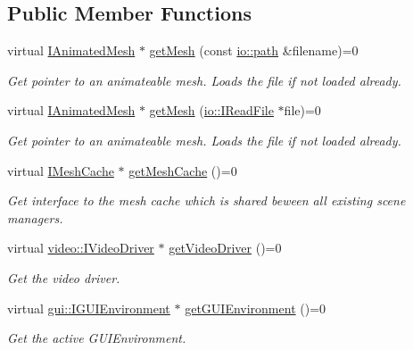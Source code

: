 \subsection*{Public Member Functions}
\begin{DoxyCompactItemize}
\item 
virtual \hyperlink{classirr_1_1scene_1_1IAnimatedMesh}{I\+Animated\+Mesh} $\ast$ \hyperlink{classirr_1_1scene_1_1ISceneManager_a63894c3f3d46cfc385116f1705935e03}{get\+Mesh} (const \hyperlink{namespaceirr_1_1io_ab1bdc45edb3f94d8319c02bc0f840ee1}{io\+::path} \&filename)=0
\begin{DoxyCompactList}\small\item\em Get pointer to an animateable mesh. Loads the file if not loaded already. \end{DoxyCompactList}\item 
virtual \hyperlink{classirr_1_1scene_1_1IAnimatedMesh}{I\+Animated\+Mesh} $\ast$ \hyperlink{classirr_1_1scene_1_1ISceneManager_af0ff82d7bac969d6a30f67c7b1fa0c46}{get\+Mesh} (\hyperlink{classirr_1_1io_1_1IReadFile}{io\+::\+I\+Read\+File} $\ast$file)=0
\begin{DoxyCompactList}\small\item\em Get pointer to an animateable mesh. Loads the file if not loaded already. \end{DoxyCompactList}\item 
virtual \hyperlink{classirr_1_1scene_1_1IMeshCache}{I\+Mesh\+Cache} $\ast$ \hyperlink{classirr_1_1scene_1_1ISceneManager_a45d89c816e33abe0e77eb063d7ce58a8}{get\+Mesh\+Cache} ()=0
\begin{DoxyCompactList}\small\item\em Get interface to the mesh cache which is shared beween all existing scene managers. \end{DoxyCompactList}\item 
virtual \hyperlink{classirr_1_1video_1_1IVideoDriver}{video\+::\+I\+Video\+Driver} $\ast$ \hyperlink{classirr_1_1scene_1_1ISceneManager_afde082160205a8faab44cd5b61e3745c}{get\+Video\+Driver} ()=0
\begin{DoxyCompactList}\small\item\em Get the video driver. \end{DoxyCompactList}\item 
virtual \hyperlink{classirr_1_1gui_1_1IGUIEnvironment}{gui\+::\+I\+G\+U\+I\+Environment} $\ast$ \hyperlink{classirr_1_1scene_1_1ISceneManager_ad887536e9cc41d0670364f9f0a0f4510}{get\+G\+U\+I\+Environment} ()=0
\begin{DoxyCompactList}\small\item\em Get the active G\+U\+I\+Environment. \end{DoxyCompactList}\item 

\end{DoxyCompactItemize}
